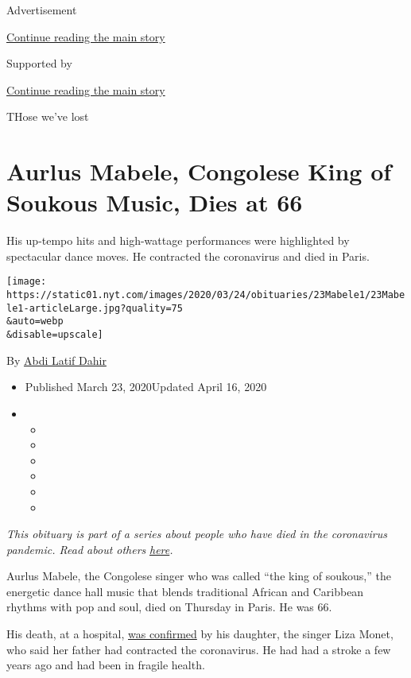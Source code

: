 Advertisement

\protect\hyperlink{after-top}{Continue reading the main story}

Supported by

\protect\hyperlink{after-sponsor}{Continue reading the main story}

THose we've lost

\hypertarget{aurlus-mabele-congolese-king-of-soukous-music-dies-at-66}{%
\section{Aurlus Mabele, Congolese King of Soukous Music, Dies at
66}\label{aurlus-mabele-congolese-king-of-soukous-music-dies-at-66}}

His up-tempo hits and high-wattage performances were highlighted by
spectacular dance moves. He contracted the coronavirus and died in
Paris.

\texttt{[image: https://static01.nyt.com/images/2020/03/24/obituaries/23Mabele1/23Mabele1-articleLarge.jpg?quality=75\\\&auto=webp\\\&disable=upscale]}

By \href{https://www.nytimes.com/by/abdi-latif-dahir}{Abdi Latif Dahir}

\begin{itemize}
\item
  Published March 23, 2020Updated April 16, 2020
\item
  \begin{itemize}
  \item
  \item
  \item
  \item
  \item
  \item
  \end{itemize}
\end{itemize}

\emph{This obituary is part of a series about people who have died in
the coronavirus pandemic. Read about others}
\href{https://www.nytimes.com/series/people-who-have-died-of-the-coronavirus}{\emph{here}}\emph{.}

Aurlus Mabele, the Congolese singer who was called ``the king of
soukous,'' the energetic dance hall music that blends traditional
African and Caribbean rhythms with pop and soul, died on Thursday in
Paris. He was 66.

His death, at a hospital,
\href{https://www.facebook.com/lizamonetofficial/posts/1566001873562459}{was
confirmed} by his daughter, the singer Liza Monet, who said her father
had contracted the coronavirus. He had had a stroke a few years ago and
had been in fragile health.

